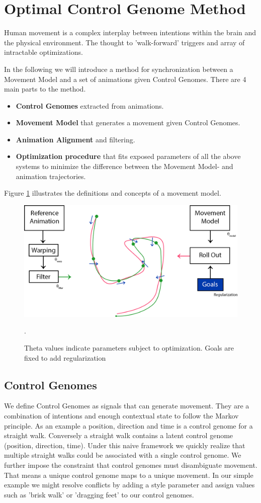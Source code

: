 \section{Optimal Control Genome Method}
Human movement is a complex interplay between intentions within the brain and the physical environment. The thought to 'walk-forward' triggers and array of intractable optimizations. 

In the following we will introduce a method for synchronization between a Movement Model and a set of animations given Control Genomes. There are 4 main parts to the method. 
\begin{itemize}
    \item \textbf{Control Genomes} extracted from animations.
    \item \textbf{Movement Model} that generates a movement given Control Genomes.
    \item \textbf{Animation Alignment} and filtering. 
    \item \textbf{Optimization procedure} that fits exposed parameters of all the above systems to minimize the difference between the Movement Model- and animation trajectories.
\end{itemize}
Figure \ref{fig:movement:model} illustrates the definitions and concepts of a movement model.
\begin{figure}
    \centering
    \includegraphics[width=0.75\linewidth]{img/method-overview.png}
    \caption{Theta values indicate parameters subject to optimization. Goals are fixed to add regularization}.
    \label{fig:movement:model}
\end{figure}

\subsection{Control Genomes}
We define Control Genomes as signals that can generate movement. They are a combination of intentions and enough contextual state to follow the Markov principle. As an example a position, direction and time is a control genome for a straight walk. Conversely a straight walk contains a latent control genome (position, direction, time). Under this naive framework we quickly realize that multiple straight walks could be associated with a single control genome. We further impose the constraint that control genomes must disambiguate movement. That means a unique control genome maps to a unique movement. In our simple example we might resolve conflicts by adding a style parameter and assign values such as 'brisk walk' or 'dragging feet' to our control genomes. 


